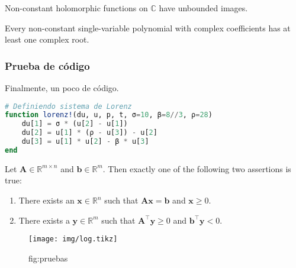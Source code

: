 \begin{coro}{}{}
	Non-constant holomorphic functions on $\mathbb{C}$  have unbounded 
	images.
\end{coro}

\begin{coro}{}{}
	Every non-constant single-variable polynomial with complex 
	coefficients has at least one complex root.
\end{coro}

\subsubsection{Prueba de código}
Finalmente, un poco de código.

\begin{lstlisting}[language=julia, caption=Aplicando algoritmo de cifrado]
# Definiendo sistema de Lorenz
function lorenz!(du, u, p, t, σ=10, β=8//3, ρ=28)
    du[1] = σ * (u[2] - u[1])
    du[2] = u[1] * (ρ - u[3]) - u[2]
    du[3] = u[1] * u[2] - β * u[3]
end
\end{lstlisting}

\lipsum[3][1-3]

\begin{lemma}{}{}
	Let $\displaystyle \mathbf{A} \in \mathbb{R}^{m\times n}$ and 
	$\displaystyle \mathbf{b} \in \mathbb {R}^{m}$. Then exactly one 
	of the following two assertions is true:
	\begin{enumerate}
		\item There exists an $\displaystyle \mathbf{x} \in \mathbb 
			{R} ^{n}$ such that $\mathbf{Ax} =\mathbf{b}$ and 
			$\displaystyle \mathbf{x} \geq 0$.
		\item There exists a $\displaystyle \mathbf{y} \in \mathbb
			{R}^{m}$ such that $\displaystyle 
			\mathbf{A}^{\top}\mathbf{y} \geq 0$ and $\displaystyle 
			\mathbf{b}^{\top}\mathbf{y} <0$.
	\end{enumerate}
\end{lemma}


\begin{figure}
\centering
\texttt{[image: img/log.tikz]}
\caption{fig:pruebas}
\end{figure}
